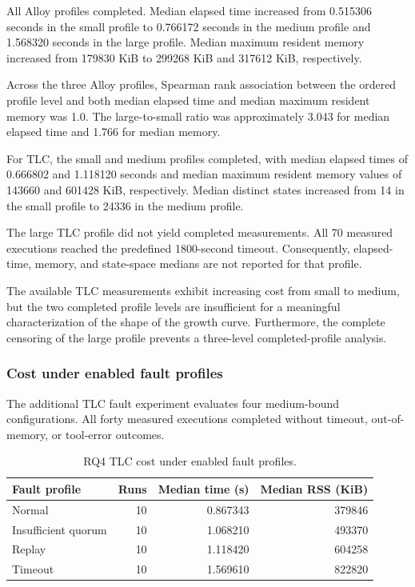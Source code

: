 All Alloy profiles completed. Median elapsed time increased from
0.515306 seconds in the small profile to 0.766172 seconds in the
medium profile and 1.568320 seconds in the large profile. Median
maximum resident memory increased from 179830 KiB to 299268 KiB and
317612 KiB, respectively.

Across the three Alloy profiles, Spearman rank association between the
ordered profile level and both median elapsed time and median maximum
resident memory was 1.0. The large-to-small ratio was approximately
3.043 for median elapsed time and 1.766 for median memory.

For TLC, the small and medium profiles completed, with median elapsed
times of 0.666802 and 1.118120 seconds and median maximum resident
memory values of 143660 and 601428 KiB, respectively. Median distinct
states increased from 14 in the small profile to 24336 in the medium
profile.

The large TLC profile did not yield completed measurements. All 70
measured executions reached the predefined 1800-second timeout.
Consequently, elapsed-time, memory, and state-space medians are not
reported for that profile.

The available TLC measurements exhibit increasing cost from small to
medium, but the two completed profile levels are insufficient for a
meaningful characterization of the shape of the growth curve.
Furthermore, the complete censoring of the large profile prevents a
three-level completed-profile analysis.

\subsubsection{Cost under enabled fault profiles}
\label{subsubsec:rq4-fault-cost}

The additional TLC fault experiment evaluates four medium-bound
configurations. All forty measured executions completed without
timeout, out-of-memory, or tool-error outcomes.

\begin{table}[htbp]
\centering
\small
\caption{RQ4 TLC cost under enabled fault profiles.}
\label{tab:rq4-fault-cost}
\begin{tabular}{lrrr}
\hline
Fault profile &
Runs &
Median time (s) &
Median RSS (KiB) \\
\hline
Normal               & 10 & 0.867343 & 379846 \\
Insufficient quorum  & 10 & 1.068210 & 493370 \\
Replay               & 10 & 1.118420 & 604258 \\
Timeout              & 10 & 1.569610 & 822820 \\
\hline
\end{tabular}
\end{table}

